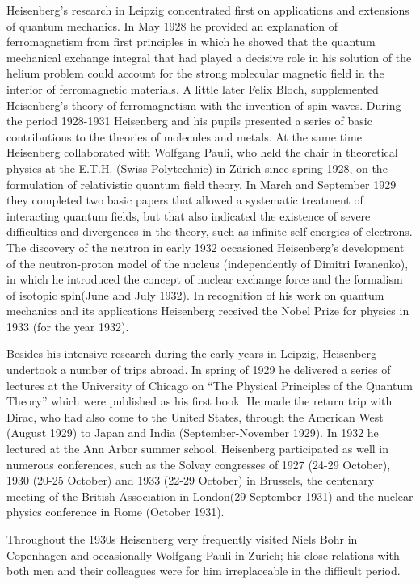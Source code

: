 \documentclass{article}
\begin{document}
Heisenberg's research in Leipzig concentrated first on applications and extensions of quantum mechanics. In May 1928 he provided an explanation of ferromagnetism from first principles in which he showed that the quantum mechanical exchange integral that had played a decisive role in his solution of the helium problem could account for the strong molecular magnetic field in the interior of ferromagnetic materials. A little later Felix Bloch, supplemented Heisenberg's theory of ferromagnetism with the invention of spin waves. During the period 1928-1931 Heisenberg and his pupils presented a series of basic contributions to the theories of molecules and metals. At the same time Heisenberg collaborated with Wolfgang Pauli, who held the chair in theoretical physics at the E.T.H. (Swiss Polytechnic) in  Zürich since spring 1928, on the formulation of relativistic quantum field theory. In March and September 1929 they completed two basic papers that allowed a systematic treatment of interacting quantum fields, but that also indicated the existence of severe difficulties and divergences in the theory, such as infinite self energies of electrons. The discovery of the neutron in early 1932 occasioned Heisenberg's development of the neutron-proton model of the nucleus (independently of Dimitri Iwanenko), in which he introduced the concept of nuclear exchange force and the formalism of isotopic spin(June and July 1932). In recognition of his work on quantum mechanics and its applications Heisenberg received the Nobel Prize for physics in 1933 (for the year 1932).

Besides his intensive research during the early years in Leipzig, Heisenberg undertook a number of trips abroad. In spring of 1929 he delivered a series of lectures at the University of Chicago on “The Physical Principles of the Quantum Theory” which were published as his first book. He made the return trip with Dirac, who had also come to the United States, through the American West (August 1929) to Japan and India (September-November 1929). In 1932 he lectured at the Ann Arbor summer school. Heisenberg participated as well in numerous conferences, such as the Solvay congresses of 1927 (24-29 October), 1930 (20-25 October) and 1933 (22-29 October) in Brussels, the centenary meeting of the British Association in London(29 September 1931) and the nuclear physics conference in Rome (October 1931).

Throughout the 1930s Heisenberg very frequently visited Niels Bohr in Copenhagen and occasionally Wolfgang Pauli in Zurich; his close relations with both men and their colleagues were for him irreplaceable in the difficult period.
\end{document}
